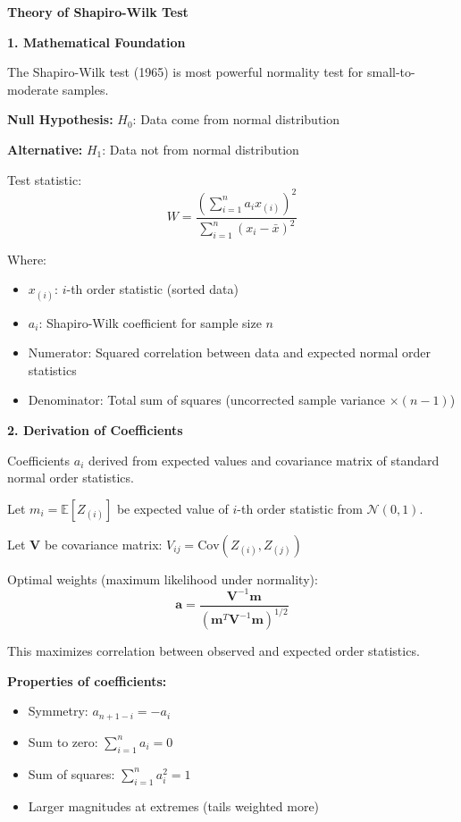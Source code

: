 \documentclass[12pt]{article}
\begin{document}
\begin{explanation}

\textbf{Theory of Shapiro-Wilk Test}

\textbf{1. Mathematical Foundation}

The Shapiro-Wilk test (1965) is most powerful normality test for small-to-moderate samples.

\textbf{Null Hypothesis:} $H_0$: Data come from normal distribution

\textbf{Alternative:} $H_1$: Data not from normal distribution

Test statistic:
\[W = \frac{(\sum_{i=1}^{n} a_i x_{(i)})^2}{\sum_{i=1}^{n} (x_i - \bar{x})^2}\]

Where:
\begin{itemize}
\item $x_{(i)}$: $i$-th order statistic (sorted data)
\item $a_i$: Shapiro-Wilk coefficient for sample size $n$
\item Numerator: Squared correlation between data and expected normal order statistics
\item Denominator: Total sum of squares (uncorrected sample variance $\times (n-1)$)
\end{itemize}

\textbf{2. Derivation of Coefficients}

Coefficients $a_i$ derived from expected values and covariance matrix of standard normal order statistics.

Let $m_i = \mathbb{E}[Z_{(i)}]$ be expected value of $i$-th order statistic from $\mathcal{N}(0,1)$.

Let $\mathbf{V}$ be covariance matrix: $V_{ij} = \text{Cov}(Z_{(i)}, Z_{(j)})$

Optimal weights (maximum likelihood under normality):
\[\mathbf{a} = \frac{\mathbf{V}^{-1} \mathbf{m}}{(\mathbf{m}^T \mathbf{V}^{-1} \mathbf{m})^{1/2}}\]

This maximizes correlation between observed and expected order statistics.

\textbf{Properties of coefficients:}
\begin{itemize}
\item Symmetry: $a_{n+1-i} = -a_i$
\item Sum to zero: $\sum_{i=1}^{n} a_i = 0$
\item Sum of squares: $\sum_{i=1}^{n} a_i^2 = 1$
\item Larger magnitudes at extremes (tails weighted more)
\end{itemize}


\end{explanation}
\end{document}
